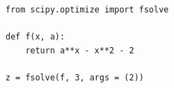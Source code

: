 \begin{itemize}
\begin{Exercise}
\end{Exercise}
\begin{Answer}
\begin{lstlisting}
from scipy.optimize import fsolve

def f(x, a):
    return a**x - x**2 - 2
    
z = fsolve(f, 3, args = (2))
\end{lstlisting}
\end{Answer}

\end{itemize}